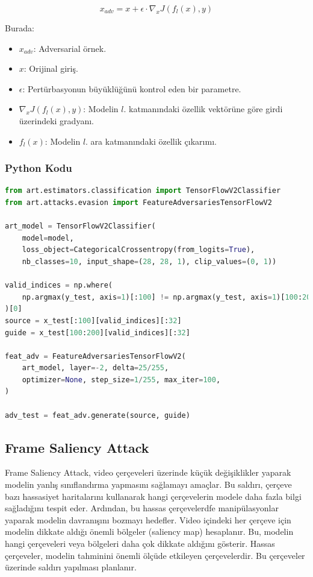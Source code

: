 \[ x_{adv} = x + \epsilon \cdot \nabla_x J(f_l(x), y) \]

Burada:

\begin{itemize}
    \item $x_{adv}$: Adversarial örnek.
    \item $x$: Orijinal giriş.
    \item $\epsilon$: Pertürbasyonun büyüklüğünü kontrol eden bir parametre.
    \item $\nabla_x J(f_l(x), y)$: Modelin $l$. katmanındaki özellik vektörüne göre girdi üzerindeki gradyanı.
    \item $f_l(x)$: Modelin $l$. ara katmanındaki özellik çıkarımı.
\end{itemize}

\subsubsection{Python Kodu}

\begin{lstlisting}[language=Python]
from art.estimators.classification import TensorFlowV2Classifier
from art.attacks.evasion import FeatureAdversariesTensorFlowV2

art_model = TensorFlowV2Classifier(
    model=model, 
    loss_object=CategoricalCrossentropy(from_logits=True), 
    nb_classes=10, input_shape=(28, 28, 1), clip_values=(0, 1))

valid_indices = np.where(
    np.argmax(y_test, axis=1)[:100] != np.argmax(y_test, axis=1)[100:200]
)[0]
source = x_test[:100][valid_indices][:32]
guide = x_test[100:200][valid_indices][:32]

feat_adv = FeatureAdversariesTensorFlowV2(
    art_model, layer=-2, delta=25/255,
    optimizer=None, step_size=1/255, max_iter=100,
)

adv_test = feat_adv.generate(source, guide)
\end{lstlisting}

\newpage

\subsection{Frame Saliency Attack}

Frame Saliency Attack, video çerçeveleri üzerinde küçük değişiklikler yaparak modelin yanlış sınıflandırma yapmasını sağlamayı amaçlar. Bu saldırı, çerçeve bazı hassasiyet haritalarını kullanarak hangi çerçevelerin modele daha fazla bilgi sağladığını tespit eder. Ardından, bu hassas çerçevelerdfe manipülasyonlar yaparak modelin davranışını bozmayı hedefler. Video içindeki her çerçeve için modelin dikkate aldığı önemli bölgeler (saliency map) hesaplanır. Bu, modelin hangi çerçeveleri veya bölgeleri daha çok dikkate aldığını gösterir. Hassas çerçeveler, modelin tahminini önemli ölçüde etkileyen çerçevelerdir. Bu çerçeveler üzerinde saldırı yapılması planlanır.

